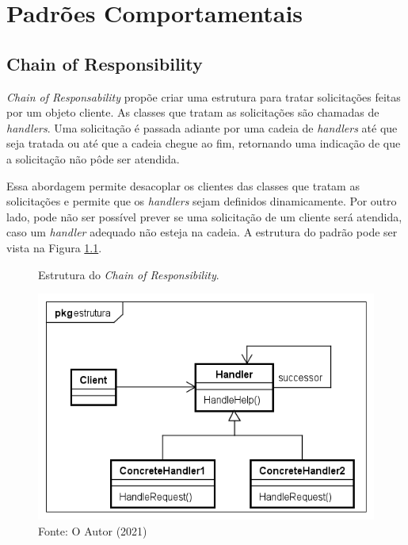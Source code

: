 \chapter{Padrões Comportamentais}

\section{Chain of Responsibility}

\textit{Chain of Responsability} propõe criar uma estrutura para 
tratar solicitações feitas por um objeto cliente. As classes 
que tratam as solicitações são chamadas de \textit{handlers}. 
Uma solicitação é passada adiante por uma cadeia de 
\textit{handlers} até que seja tratada ou 
até que a cadeia chegue ao fim, retornando uma 
indicação de que a solicitação não pôde ser atendida.\cite{gamma:1995}

Essa abordagem permite desacoplar os clientes das classes 
que tratam as solicitações e permite que os \textit{handlers} 
sejam definidos dinamicamente. Por outro lado, pode não ser 
possível prever se uma solicitação de um cliente será atendida, 
caso um \textit{handler} adequado não esteja na cadeia. A 
estrutura do padrão pode ser vista na Figura \ref{chain_struct}.

\begin{figure}[htb]
	\caption{\label{chain_struct}Estrutura do \textit{Chain of Responsibility}.}
	\begin{center}
	    \includegraphics[scale=0.5]{5_padroes-contexto-funcional/5.3_comportamentais/5.3.01_chain-of-responsibility/chainofresponsibility_struct.png}
	\end{center}
  \caption*{Fonte: O Autor (2021)}
\end{figure}

